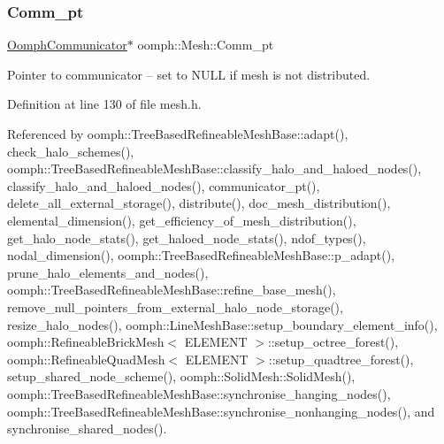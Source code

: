 \mbox{\label{classoomph_1_1Mesh_a775158642d3320e0d709bcccd790875f}} 
\subsubsection{\texorpdfstring{Comm\+\_\+pt}{Comm\_pt}}
{\footnotesize\ttfamily \hyperlink{classoomph_1_1OomphCommunicator}{Oomph\+Communicator}$\ast$ oomph\+::\+Mesh\+::\+Comm\+\_\+pt\hspace{0.3cm}{\ttfamily [protected]}}



Pointer to communicator -- set to N\+U\+LL if mesh is not distributed. 



Definition at line 130 of file mesh.\+h.



Referenced by oomph\+::\+Tree\+Based\+Refineable\+Mesh\+Base\+::adapt(), check\+\_\+halo\+\_\+schemes(), oomph\+::\+Tree\+Based\+Refineable\+Mesh\+Base\+::classify\+\_\+halo\+\_\+and\+\_\+haloed\+\_\+nodes(), classify\+\_\+halo\+\_\+and\+\_\+haloed\+\_\+nodes(), communicator\+\_\+pt(), delete\+\_\+all\+\_\+external\+\_\+storage(), distribute(), doc\+\_\+mesh\+\_\+distribution(), elemental\+\_\+dimension(), get\+\_\+efficiency\+\_\+of\+\_\+mesh\+\_\+distribution(), get\+\_\+halo\+\_\+node\+\_\+stats(), get\+\_\+haloed\+\_\+node\+\_\+stats(), ndof\+\_\+types(), nodal\+\_\+dimension(), oomph\+::\+Tree\+Based\+Refineable\+Mesh\+Base\+::p\+\_\+adapt(), prune\+\_\+halo\+\_\+elements\+\_\+and\+\_\+nodes(), oomph\+::\+Tree\+Based\+Refineable\+Mesh\+Base\+::refine\+\_\+base\+\_\+mesh(), remove\+\_\+null\+\_\+pointers\+\_\+from\+\_\+external\+\_\+halo\+\_\+node\+\_\+storage(), resize\+\_\+halo\+\_\+nodes(), oomph\+::\+Line\+Mesh\+Base\+::setup\+\_\+boundary\+\_\+element\+\_\+info(), oomph\+::\+Refineable\+Brick\+Mesh$<$ E\+L\+E\+M\+E\+N\+T $>$\+::setup\+\_\+octree\+\_\+forest(), oomph\+::\+Refineable\+Quad\+Mesh$<$ E\+L\+E\+M\+E\+N\+T $>$\+::setup\+\_\+quadtree\+\_\+forest(), setup\+\_\+shared\+\_\+node\+\_\+scheme(), oomph\+::\+Solid\+Mesh\+::\+Solid\+Mesh(), oomph\+::\+Tree\+Based\+Refineable\+Mesh\+Base\+::synchronise\+\_\+hanging\+\_\+nodes(), oomph\+::\+Tree\+Based\+Refineable\+Mesh\+Base\+::synchronise\+\_\+nonhanging\+\_\+nodes(), and synchronise\+\_\+shared\+\_\+nodes().

\mbox{\label{classoomph_1_1Mesh_a12243d0fee2b1fcee729ee5a4777ea10}} 

